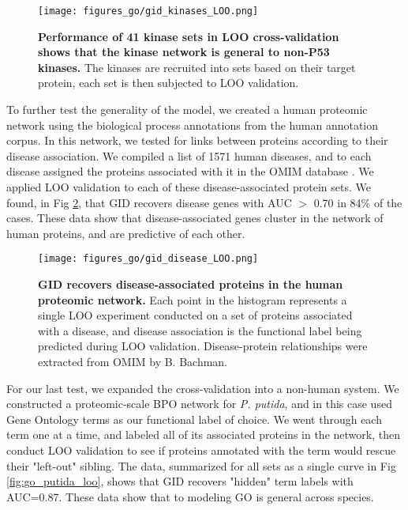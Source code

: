 \documentclass[12pt,a4paper]{report}
\begin{document}
{{\begin{figure}
\begin{minipage}[c][\textheight]{\textwidth}
\vspace*{-3.5in}
\centering
  \texttt{[image: figures\_go/gid\_kinases\_LOO.png]}
  \caption[Human kinases LOO validation.]{\textbf{Performance of 41 kinase sets in LOO cross-validation shows that the kinase network is general to non-P53 kinases.} The kinases are recruited into sets based on their target protein, each set is then subjected to LOO validation.}
  \label{fig:go_kinases_loo}
  \end{minipage}

\end{figure}

To further test the generality of the model, we created a human proteomic network using the biological process annotations from the human annotation corpus. In this network, we tested for links between proteins according to their disease association. We compiled a list of 1571 human diseases, and to each disease assigned the proteins associated with it in the OMIM database \cite{omim}. We applied LOO validation to each of these disease-associated protein sets. We found, in Fig \ref{fig:go_diseases_loo}, that GID recovers disease genes with AUC $>$ 0.70 in 84\% of the cases. These data show that disease-associated genes cluster in the network of human proteins, and are predictive of each other.

\begin{figure}
\begin{minipage}[c][\textheight]{\textwidth}
\vspace*{-4in}
\centering
  \texttt{[image: figures\_go/gid\_disease\_LOO.png]}
  \caption[Human disease set LOO validation.]{\textbf{GID recovers disease-associated proteins in the human proteomic network.} Each point in the histogram represents a single LOO experiment conducted on a set of proteins associated with a disease, and disease association is the functional label being predicted during LOO validation. Disease-protein relationships were extracted from OMIM by B. Bachman.}
  \label{fig:go_diseases_loo}
  \end{minipage}

\end{figure}

For our last test, we expanded the cross-validation into a non-human system. We constructed a proteomic-scale BPO network for \textit{P. putida}, and in this case used Gene Ontology terms as our functional label of choice. We went through each term one at a time, and labeled all of its associated proteins in the network, then conduct LOO validation to see if proteins annotated with the term would rescue their "left-out" sibling. The data, summarized for all sets as a single curve in Fig \ref{fig:go_putida_loo}, shows that GID recovers "hidden" term labels with AUC=0.87. These data show that to modeling GO is general across species.

}}
\end{document}
